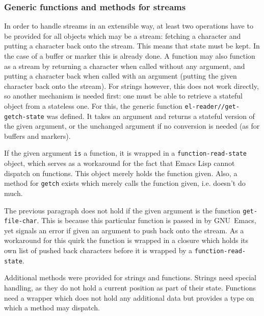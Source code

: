 \documentclass[a4paper,10pt,twoside]{report}
\newcommand{\el}{Emacs Lisp}
\newcommand{\sym}[1]{\texttt{#1}}
\newcommand{\fun}[1]{\texttt{#1}}
\newcommand{\emacs}{GNU~Emacs}
\begin{document}
\subsubsection{Generic functions and methods for streams}
\label{subsubsec:multimethods-streams}

In order to handle streams in an extensible way, at least two operations have to
be provided for all objects which may be a stream: fetching a character and
putting a character back onto the stream.  This means that state must be kept.
In the case of a buffer or marker this is already done.  A function may also
function as a stream by returning a character when called without any argument,
and putting a character back when called with an argument (putting the given
character back onto the stream).  For strings however, this does not work
directly, so another mechanism is needed first: one must be able to retrieve a
stateful object from a stateless one.  For this, the generic function
\fun{el-reader//get-getch-state} was defined.  It takes an argument and returns
a stateful version of the given argument, or the unchanged argument if no
conversion is needed (as for buffers and markers).


If the given argument \texttt{is} a function, it is wrapped in a
\sym{function-read-state} object, which serves as a workaround for
the fact that \el{} cannot dispatch on functions.  This object merely holds the
function given.  Also, a method for \fun{getch} exists which merely
calls the function given, i.e. doesn't do much.

The previous paragraph does not hold if the given argument is the function
\fun{get-file-char}.  This is because this particular function is passed in by
\emacs{}, yet signals an error if given an argument to push back onto the
stream.  As a workaround for this quirk the function is wrapped in a closure
which holds its own list of pushed back characters before it is wrapped by a
\sym{function-read-state}.

Additional methods were provided for strings and functions.  Strings need
special handling, as they do not hold a current position as part of their
state.  Functions need a wrapper which does not hold any additional data but
provides a type on which a method may dispatch.
\end{document}
